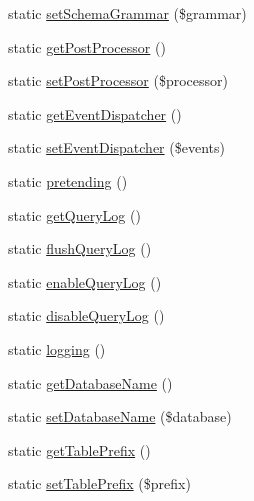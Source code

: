 \begin{DoxyCompactItemize}
\item 
static \mbox{\hyperlink{class_illuminate_1_1_support_1_1_facades_1_1_d_b_ad43cad4300f721b01b177987a20b40ea}{set\+Schema\+Grammar}} (\$grammar)
\item 
static \mbox{\hyperlink{class_illuminate_1_1_support_1_1_facades_1_1_d_b_a0ac3adf5c9525dba15fe714c649ecadc}{get\+Post\+Processor}} ()
\item 
static \mbox{\hyperlink{class_illuminate_1_1_support_1_1_facades_1_1_d_b_a48aba498dabc6974940c6714f14319fa}{set\+Post\+Processor}} (\$processor)
\item 
static \mbox{\hyperlink{class_illuminate_1_1_support_1_1_facades_1_1_d_b_a1ff6d5acb9beaa2bfdcdc13bec293acb}{get\+Event\+Dispatcher}} ()
\item 
static \mbox{\hyperlink{class_illuminate_1_1_support_1_1_facades_1_1_d_b_acebeee92ca49435062d1849ba3486eda}{set\+Event\+Dispatcher}} (\$events)
\item 
static \mbox{\hyperlink{class_illuminate_1_1_support_1_1_facades_1_1_d_b_a5f51e88132ce508656b20d03b8cdd237}{pretending}} ()
\item 
static \mbox{\hyperlink{class_illuminate_1_1_support_1_1_facades_1_1_d_b_a8fc822a5e9a499f19fd9e2d1c4e17bbe}{get\+Query\+Log}} ()
\item 
static \mbox{\hyperlink{class_illuminate_1_1_support_1_1_facades_1_1_d_b_ac14e8afef3256b2eb48f7a6a6b85759c}{flush\+Query\+Log}} ()
\item 
static \mbox{\hyperlink{class_illuminate_1_1_support_1_1_facades_1_1_d_b_a62a569b09967a98988e3e8241e92688a}{enable\+Query\+Log}} ()
\item 
static \mbox{\hyperlink{class_illuminate_1_1_support_1_1_facades_1_1_d_b_a8425946527ebafc412ad410be1db3bc7}{disable\+Query\+Log}} ()
\item 
static \mbox{\hyperlink{class_illuminate_1_1_support_1_1_facades_1_1_d_b_a2457a232d9ccf13ded59a39345635dee}{logging}} ()
\item 
static \mbox{\hyperlink{class_illuminate_1_1_support_1_1_facades_1_1_d_b_a91a05da0ccd778d6b896ec34b2f5f15d}{get\+Database\+Name}} ()
\item 
static \mbox{\hyperlink{class_illuminate_1_1_support_1_1_facades_1_1_d_b_a7fbe4bc4cc8a6fcd8bc87d024dc09cd7}{set\+Database\+Name}} (\$database)
\item 
static \mbox{\hyperlink{class_illuminate_1_1_support_1_1_facades_1_1_d_b_a9aa67ed692d97343d3d1abf5d40fd52b}{get\+Table\+Prefix}} ()
\item 
static \mbox{\hyperlink{class_illuminate_1_1_support_1_1_facades_1_1_d_b_a6eda107e9bd63c513cba9b353d7bfd63}{set\+Table\+Prefix}} (\$prefix)

\end{DoxyCompactItemize}
